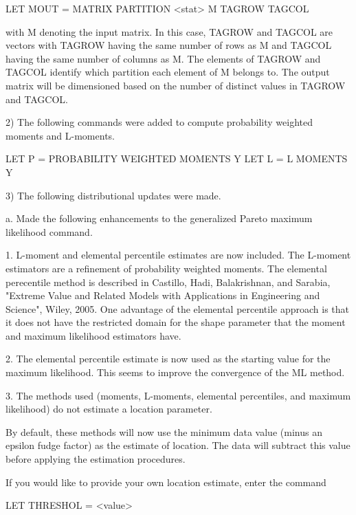 {          LET MOUT = MATRIX PARTITION <stat> M TAGROW TAGCOL

       with M denoting the input matrix.  In this case, TAGROW and
       TAGCOL are vectors with TAGROW having the same number of rows
       as M and TAGCOL having the same number of columns as M.
       The elements of TAGROW and TAGCOL identify which partition
       each element of M belongs to.  The output matrix will be
       dimensioned based on the number of distinct values in
       TAGROW and TAGCOL.

 2) The following commands were added to compute probability
    weighted moments and L-moments.

       LET P = PROBABILITY WEIGHTED MOMENTS Y
       LET L = L MOMENTS Y

 3) The following distributional updates were made.

    a. Made the following enhancements to the generalized Pareto
       maximum likelihood command.

       1. L-moment and elemental percentile estimates are now
          included.  The L-moment estimators are a refinement of
          probability weighted moments.  The elemental perecentile
          method is described in Castillo, Hadi, Balakrishnan, and
          Sarabia, "Extreme Value and Related Models with
          Applications in Engineering and Science", Wiley, 2005.
          One advantage of the elemental percentile approach is that
          it does not have the restricted domain for the shape
          parameter that the moment and maximum likelihood estimators
          have.

       2. The elemental percentile estimate is now used as the
          starting value for the maximum likelihood.  This seems
          to improve the convergence of the ML method.

       3. The methods used (moments, L-moments, elemental percentiles,
          and maximum likelihood) do not estimate a location
          parameter.

          By default, these methods will now use the minimum data
          value (minus an epsilon fudge factor) as the estimate of
          location.  The data will subtract this value before
          applying the estimation procedures.

          If you would like to provide your own location estimate,
          enter the command

              LET THRESHOL = <value>

}
